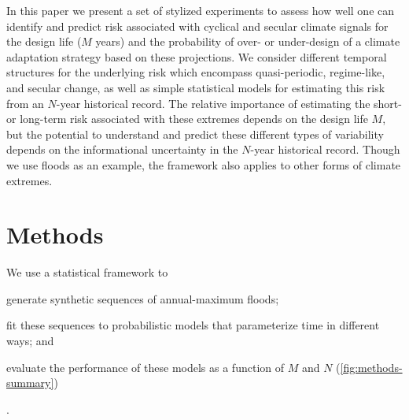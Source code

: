 \documentclass[
  draft,
  linenumbers
]{agujournal2018}
\begin{document}
In this paper we present a set of stylized experiments to assess how well one can identify and predict risk associated with cyclical and secular climate signals for the design life ($M$ years) and the probability of over- or under-design of a climate adaptation strategy based on these projections.
We consider different temporal structures for the underlying risk which encompass quasi-periodic, regime-like, and secular change, as well as simple statistical models for estimating this risk from an $N$-year historical record.
The relative importance of estimating the short- or long-term risk associated with these extremes depends on the design life $M$, but the potential to understand and predict these different types of variability depends on the informational uncertainty in the $N$-year historical record.
Though we use floods as an example, the framework also applies to other forms of climate extremes.


\section{Methods}\label{sec:methods}

We use a statistical framework to
\begin{enumerate*}[label= (\roman*)]
  \item generate synthetic sequences of annual-maximum floods;
  \item fit these sequences to probabilistic models that parameterize time in different ways; and
  \item evaluate the performance of these models as a function of $M$ and $N$ (\cref{fig:methods-summary})
\end{enumerate*}.
\end{document}
